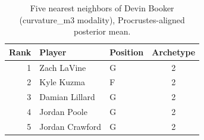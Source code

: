 \begin{table}[htbp]
  \centering\small
  \begin{tabular}{rllc}
    \toprule
    Rank & Player & Position & Archetype \\
    \midrule
    1 & Zach LaVine & G & 2 \\
    2 & Kyle Kuzma & F & 2 \\
    3 & Damian Lillard & G & 2 \\
    4 & Jordan Poole & G & 2 \\
    5 & Jordan Crawford & G & 2 \\
    \bottomrule
  \end{tabular}
  \caption{Five nearest neighbors of Devin Booker (curvature_m3 modality), Procrustes-aligned posterior mean.}
  \label{tab:Devin_Booker_neighbors_curvature_m3}
\end{table}

